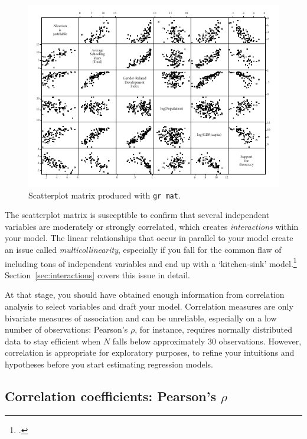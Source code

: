 \begin{figure}[htp]
	\centering
	\includegraphics[width=.9\textwidth]{images/abortion_grmat.pdf}

	\caption[Scatterplot matrix with ]{\label{fig:grmat}
	Scatterplot matrix produced with \texttt{gr mat}. \qog}
\end{figure}%

The scatterplot matrix is susceptible to confirm that several independent variables are moderately or strongly correlated, which creates \emph{interactions} within your model. The linear relationships that occur in parallel to your model create an issue called \emph{multicollinearity}, especially if you fall for the common flaw of including tons of independent variables and end up with a `kitchen-sink' model.\footcite{Schrodt:2011a} Section~\ref{sec:interactions} covers this issue in detail.

At that stage, you should have obtained enough information from correlation analysis to select variables and draft your model. Correlation measures are only bivariate measures of association and can be unreliable, especially on a low number of observations: Pearson's $\rho$, for instance, requires normally distributed data to stay efficient when $N$ falls below approximately 30 observations. However, correlation is appropriate for exploratory purposes, to refine your intuitions and hypotheses before you start estimating regression models.

  \subsection{Correlation coefficients: Pearson's $\rho$}

